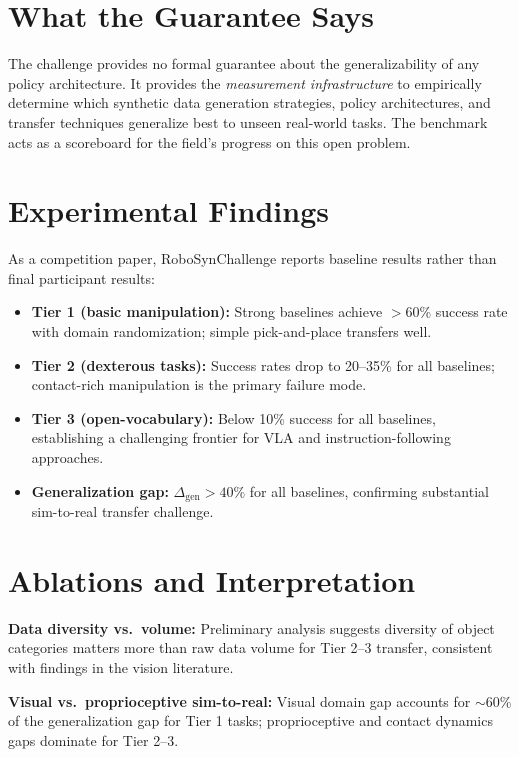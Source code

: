 \documentclass[10pt,twocolumn]{article}
\begin{document}
\section{What the Guarantee Says}

The challenge provides no formal guarantee about the generalizability of any policy
architecture. It provides the \emph{measurement infrastructure} to empirically determine
which synthetic data generation strategies, policy architectures, and transfer techniques
generalize best to unseen real-world tasks. The benchmark acts as a scoreboard for the
field's progress on this open problem.

\section{Experimental Findings}

As a competition paper, RoboSynChallenge reports baseline results rather than final
participant results:
\begin{itemize}[itemsep=2pt,parsep=0pt]
  \item \textbf{Tier 1 (basic manipulation):} Strong baselines achieve $>$60\% success rate
    with domain randomization; simple pick-and-place transfers well.
  \item \textbf{Tier 2 (dexterous tasks):} Success rates drop to 20--35\% for all baselines;
    contact-rich manipulation is the primary failure mode.
  \item \textbf{Tier 3 (open-vocabulary):} Below 10\% success for all baselines, establishing
    a challenging frontier for VLA and instruction-following approaches.
  \item \textbf{Generalization gap:} $\Delta_{\mathrm{gen}} > 40\%$ for all baselines,
    confirming substantial sim-to-real transfer challenge.
\end{itemize}

\section{Ablations and Interpretation}

\textbf{Data diversity vs.\ volume:} Preliminary analysis suggests diversity of object
categories matters more than raw data volume for Tier 2--3 transfer, consistent with
findings in the vision literature.

\textbf{Visual vs.\ proprioceptive sim-to-real:} Visual domain gap accounts for
$\sim$60\% of the generalization gap for Tier 1 tasks; proprioceptive and contact
dynamics gaps dominate for Tier 2--3.
\end{document}
